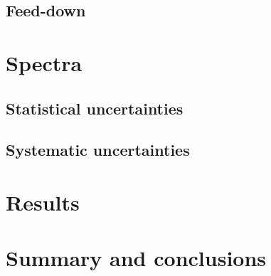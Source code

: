 \subsection{Feed-down}
\label{sec:hadron:correction:fd}




\section{Spectra}
\label{sec:hadron:spec}


\subsection{Statistical uncertainties}
\label{sec:hadron:spec:stat}


\subsection{Systematic uncertainties}
\label{sec:hadron:spec:syst}



\section{Results}

\section{Summary and conclusions}

